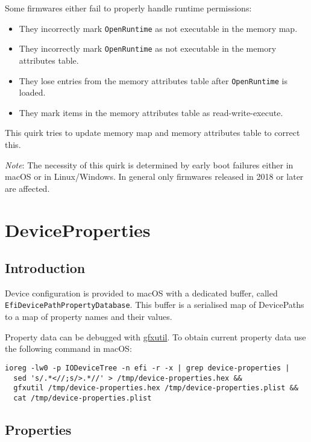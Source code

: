 \documentclass[]{article}
\providecommand{\tightlist}{%
  \setlength{\itemsep}{0pt}\setlength{\parskip}{0pt}}
\begin{document}
\begin{enumerate}
  Some firmwares either fail to properly handle runtime permissions:
  \begin{itemize}
    \tightlist
    \item They incorrectly mark \texttt{OpenRuntime} as not executable in the memory map.
    \item They incorrectly mark \texttt{OpenRuntime} as not executable in the memory
    attributes table.
    \item They lose entries from the memory attributes table after \texttt{OpenRuntime}
    is loaded.
    \item They mark items in the memory attributes table as read-write-execute.
  \end{itemize}

  This quirk tries to update memory map and memory attributes table to correct this.

  \emph{Note}: The necessity of this quirk is determined by early boot failures either in
  macOS or in Linux/Windows. In general only firmwares released in 2018 or later are affected.

\end{enumerate}

\section{DeviceProperties}\label{devprops}

\subsection{Introduction}\label{devpropsintro}

Device configuration is provided to macOS with a dedicated buffer,
called \texttt{EfiDevicePathPropertyDatabase}. This buffer is a serialised
map of DevicePaths to a map of property names and their values.

Property data can be debugged with
\href{https://github.com/acidanthera/gfxutil}{gfxutil}.
To obtain current property data use the following command in macOS:
\begin{lstlisting}[label=gfxutil, style=ocbash]
ioreg -lw0 -p IODeviceTree -n efi -r -x | grep device-properties |
  sed 's/.*<//;s/>.*//' > /tmp/device-properties.hex &&
  gfxutil /tmp/device-properties.hex /tmp/device-properties.plist &&
  cat /tmp/device-properties.plist
\end{lstlisting}

\subsection{Properties}\label{devpropsprops}
\end{document}

